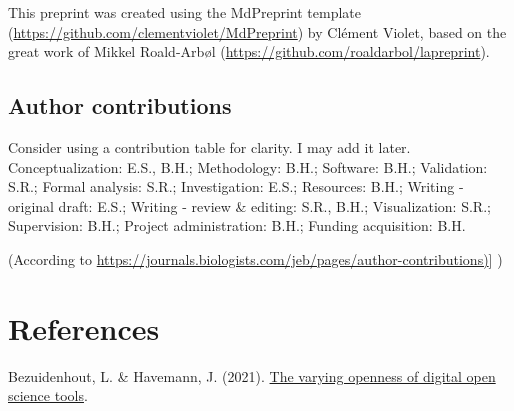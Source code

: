 \documentclass[9pt,biorxiv,doublespacing,lineno]{lapreprint}
\newlength{\cslhangindent}
\newlength{\cslentryspacingunit} %
\newenvironment{CSLReferences}[2] %
 {%
  \setlength{\parindent}{0pt}
  \ifodd #1
  \let\oldpar\par
  \def\par{\hangindent=\cslhangindent\oldpar}
  \fi
  \setlength{\parskip}{#2\cslentryspacingunit}
 }%
 {}
\begin{document}
This preprint was created using the MdPreprint template
(\url{https://github.com/clementviolet/MdPreprint}) by Clément Violet,
based on the great work of Mikkel Roald-Arbøl
(\url{https://github.com/roaldarbol/lapreprint}).

\hypertarget{author-contributions}{%
\subsection{Author contributions}\label{author-contributions}}

Consider using a contribution table for clarity. I may add it later.
Conceptualization: E.S., B.H.; Methodology: B.H.; Software: B.H.;
Validation: S.R.; Formal analysis: S.R.; Investigation: E.S.; Resources:
B.H.; Writing - original draft: E.S.; Writing - review \& editing: S.R.,
B.H.; Visualization: S.R.; Supervision: B.H.; Project administration:
B.H.; Funding acquisition: B.H.

(According to
\href{https://journals.biologists.com/jeb/pages/author-contributions}{https://journals.biologists.com/jeb/pages/author-contributions)}{]}
)

\hypertarget{references}{%
\section*{References}\label{references}}

\hypertarget{refs}{}
\begin{CSLReferences}{1}{0}
\leavevmode{}%
Bezuidenhout, L. \& Havemann, J. (2021).
\href{https://doi.org/10.12688/f1000research.26615.2}{The varying
openness of digital open science tools}.

\end{CSLReferences}

\if@endfloat\clearpage\processdelayedfloats\clearpage\fi 




\end{document}

